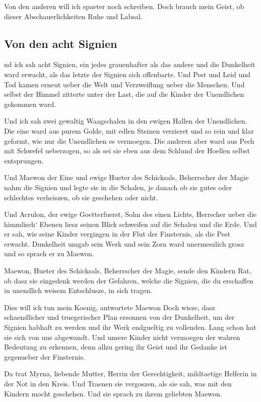 \documentclass[a5paper,8pt]{book}
\begin{document}
Von den anderen will ich spaeter noch schreiben. Doch brauch mein Geist, ob dieser Abschauerlichkeiten Ruhe und Labsal.

\newpage

\subsection{ Von den acht Signien}

nd ich sah acht Signien, ein jedes grauenhafter als das andere und die Dunkelheit ward erwacht, als das letzte der Signien sich offenbarte. Und Pest und Leid und Tod kamen erneut ueber die Welt und Verzweiflung ueber die Menschen. Und selbst der Himmel zitterte unter der Last, die auf die Kinder der Unendlichen gekommen ward.

Und ich sah zwei gewaltig Waagschalen in den ewigen Hallen der Unendlichen. Die eine ward aus purem Golde, mit edlen Steinen verzieret und so rein und klar geformt, wie nur die Unendlichen es vermoegen. Die anderen aber ward aus Pech mit Schwefel ueberzogen, so als sei sie eben aus dem Schlund der Hoellen selbst entsprungen.

Und Maewon der Eine und ewige Hueter des Schicksals, Beherrscher der Magie nahm die Signien und legte sie in die Schalen, je danach ob sie gutes oder schlechtes verheiszen, ob sie geschehen oder nicht.

Und Acrulon, der ewige Goetterfuerst, Sohn des einen Lichts, Herrscher ueber die himmlisch‘ Ebenen liesz seinen Blick schweifen auf die Schalen und die Erde. Und er sah, wie seine Kinder vergingen in der Flut der Finsternis, als die Pest erwacht. Dunkelheit umgab sein Werk und sein Zorn ward unermeszlich grosz und so sprach er zu Maewon.

Maewon, Hueter des Schicksals, Beherrscher der Magie, sende den Kindern Rat, ob dasz sie eingedenk werden der Gefahren, welche die Signien, die du erschaffen in unendlich weisem Entschlusze, in sich tragen. 

Dies will ich tun mein Koenig, antwortete Maewon Doch wisze, dasz schaendlicher und truegerischer Plan ersonnen von der Dunkelheit, um der Signien habhaft zu werden und ihr Werk endgueltig zu vollenden. Lang schon hat sie sich von uns abgewandt. Und unsere Kinder nicht vermoegen der wahren Bedeutung zu erkennen, denn allzu gering ihr Geist und ihr Gedanke ist gegenueber der Finsternis.

Da trat Myrna, liebende Mutter, Herrin der Gerechtigkeit, mildtaetige Helferin in der Not in den Kreis. Und Traenen sie vergoszen, als sie sah, was mit den Kindern mocht geschehen. Und sie sprach zu ihrem geliebten Maewon.
\end{document}
